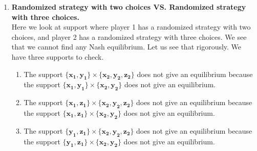 \begin{enumerate} [label=\Alph*. ]
\begin{enumerate} [label*= (\arabic*)]
    
    
    \item[] Now we can use the symmetry of the problem.
    
    \item The support $\mathbf{\{x_1, y_1\}} \times \mathbf{\{x_2, z_2\}}$ does not give an equilibrium, therefore the support $\mathbf{\{x_1, z_1\}} \times \mathbf{\{x_2, y_2\}}$ will not give an equilibrium either.
    
    \item The support $\mathbf{\{x_1, y_1\}} \times \mathbf{\{y_2, z_2\}}$ does not give an equilibrium, therefore the support $\mathbf{\{y_1, z_1\}} \times \mathbf{\{x_2, y_2\}}$ will not give an equilibrium either.
    
    \item The support $\mathbf{\{x_1, z_1\}} \times \mathbf{\{y_2, z_2\}}$ does not give an equilibrium, therefore the support $\mathbf{\{y_1, z_1\}} \times \mathbf{\{x_2, z_2\}}$ will not give an equilibrium either.
        
\end{enumerate}

\item \textbf{Randomized strategy with two choices VS. Randomized strategy with three choices.} \\
Here we look at support where player 1 has a randomized strategy with two choices, and player 2 has a randomized strategy with three choices. We see that we cannot find any Nash equilibrium. Let us see that rigorously. We have three supports to check.
\begin{enumerate} [label*= (\arabic*)]
    \item The support $\mathbf{\{x_1, y_1\}} \times \mathbf{\{x_2, y_2, z_2\}}$ does not give an equilibrium because the support $\mathbf{\{x_1, y_1\}} \times \mathbf{\{x_2, y_2\}}$ does not give an equilibrium.
    
    \item The support $\mathbf{\{x_1, z_1\}} \times \mathbf{\{x_2, y_2, z_2\}}$ does not give an equilibrium because the support $\mathbf{\{x_1, z_1\}} \times \mathbf{\{x_2, y_2\}}$ does not give an equilibrium.
    
    \item The support $\mathbf{\{y_1, z_1\}} \times \mathbf{\{x_2, y_2, z_2\}}$ does not give an equilibrium because the support $\mathbf{\{y_1, z_1\}} \times \mathbf{\{x_2, y_2\}}$ does not give an equilibrium.
\end{enumerate}


\end{enumerate}
